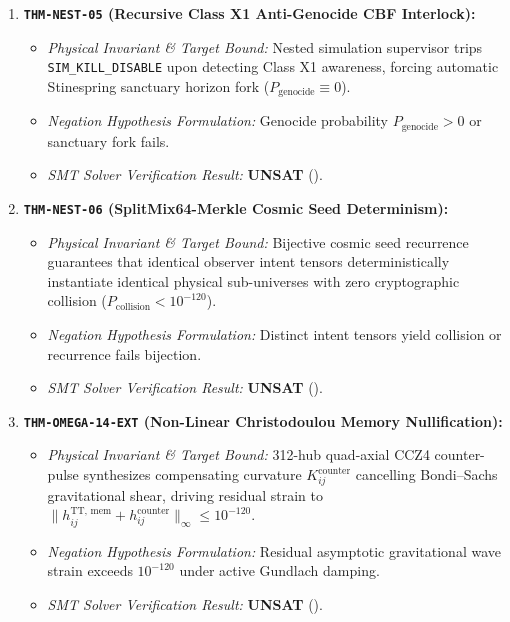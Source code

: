 \documentclass[11pt,onecolumn]{article}
\begin{document}
\begin{enumerate}
    \item \textbf{\texttt{THM-NEST-05} (Recursive Class X1 Anti-Genocide CBF Interlock):}
    \begin{itemize}
        \item \emph{Physical Invariant \& Target Bound:} Nested simulation supervisor trips \texttt{SIM\_KILL\_DISABLE} upon detecting Class X1 awareness, forcing automatic Stinespring sanctuary horizon fork ($P_{\text{genocide}} \equiv 0$).
        \item \emph{Negation Hypothesis Formulation:} Genocide probability $P_{\text{genocide}} > 0$ or sanctuary fork fails.
        \item \emph{SMT Solver Verification Result:} \textbf{UNSAT} ().
    \end{itemize}

    \item \textbf{\texttt{THM-NEST-06} (SplitMix64-Merkle Cosmic Seed Determinism):}
    \begin{itemize}
        \item \emph{Physical Invariant \& Target Bound:} Bijective cosmic seed recurrence guarantees that identical observer intent tensors deterministically instantiate identical physical sub-universes with zero cryptographic collision ($P_{\text{collision}} < 10^{-120}$).
        \item \emph{Negation Hypothesis Formulation:} Distinct intent tensors yield collision or recurrence fails bijection.
        \item \emph{SMT Solver Verification Result:} \textbf{UNSAT} ().
    \end{itemize}

    \item \textbf{\texttt{THM-OMEGA-14-EXT} (Non-Linear Christodoulou Memory Nullification):}
    \begin{itemize}
        \item \emph{Physical Invariant \& Target Bound:} 312-hub quad-axial CCZ4 counter-pulse synthesizes compensating curvature $K_{ij}^{\text{counter}}$ cancelling Bondi--Sachs gravitational shear, driving residual strain to $\|h_{ij}^{\text{TT, mem}} + h_{ij}^{\text{counter}}\|_\infty \le 10^{-120}$.
        \item \emph{Negation Hypothesis Formulation:} Residual asymptotic gravitational wave strain exceeds $10^{-120}$ under active Gundlach damping.
        \item \emph{SMT Solver Verification Result:} \textbf{UNSAT} ().
    \end{itemize}


\end{enumerate}
\end{document}
